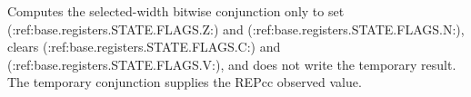 Computes the selected-width bitwise conjunction only to set (:ref:base.registers.STATE.FLAGS.Z:) and (:ref:base.registers.STATE.FLAGS.N:), clears (:ref:base.registers.STATE.FLAGS.C:) and (:ref:base.registers.STATE.FLAGS.V:), and does not write the temporary result. The temporary conjunction supplies the REPcc observed value.
